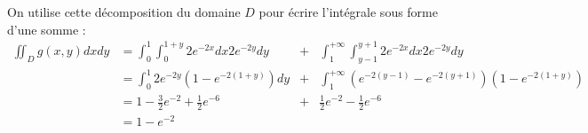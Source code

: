 {\begin{enumerate}
{		On utilise cette décomposition du domaine $D$ pour écrire l'intégrale sous forme d'une somme :
		\begin{align*}
			\iint_D g(x,y)dxdy &= \int_0^1 \int_0^{1+y}2e^{-2x}dx 2e^{-2y}dy &+&  \int_1^{+\infty} \int_{y-1}^{y+1}2e^{-2x}dx 2e^{-2y}dy	\\
			&= \int_0^1 2e^{-2y}(1-e^{-2(1+y)})dy &+&  \int_1^{+\infty} (e^{-2(y-1)}-e^{-2(y+1)})  (1-e^{-2(1+y)}) \\
			&= 1-\frac{3}{2}e^{-2}+\frac{1}{2}e^{-6} &+& \frac{1}{2}e^{-2}-\frac{1}{2}e^{-6} \\
			&= 1-e^{-2} &&
	\end{align*}
	 }
\end{enumerate}
}






